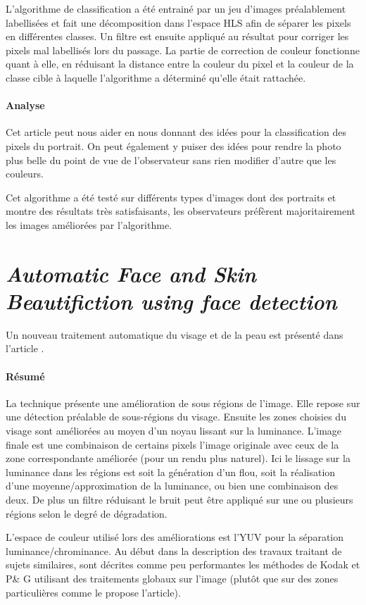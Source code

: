 \documentclass[11pt, french]{report-rd-info}
\begin{document}
L'algorithme de classification a été entrainé par un jeu d'images préalablement labellisées et fait une décomposition dans l'espace HLS afin de séparer les pixels en différentes classes. Un filtre est ensuite appliqué au résultat pour corriger les pixels mal labellisés lors du passage.
La partie de correction de couleur fonctionne quant à elle, en réduisant la distance entre la couleur du pixel et la couleur de la classe cible à laquelle l'algorithme a déterminé qu'elle était rattachée.

\paragraph{Analyse}
Cet article peut nous aider en nous donnant des idées pour la classification des pixels du portrait.
On peut également y puiser des idées pour rendre la photo plus belle du point de vue de l'observateur sans rien modifier d'autre que les couleurs.

Cet algorithme a été testé sur différents types d'images dont des portraits et montre des résultats très satisfaisants, les observateurs préfèrent majoritairement les images améliorées par l'algorithme.


\section{\emph{Automatic Face and Skin Beautifiction using face detection}}
Un nouveau traitement automatique du visage et de la peau est présenté dans l’article \cite{Ciuc2010}.

\paragraph{Résumé}
La technique présente une amélioration de sous régions de l’image.  Elle repose sur une détection préalable de sous-régions du visage. Ensuite les zones choisies du visage sont améliorées au moyen d'un noyau lissant sur la luminance. L'image finale est une combinaison de certains pixels l'image originale avec ceux de la zone correspondante améliorée (pour un rendu plus naturel).
Ici le lissage sur la luminance dans les régions est soit la génération d’un flou, soit la réalisation d’une moyenne/approximation de la luminance, ou bien une combinaison des deux. De plus un filtre réduisant le bruit peut être appliqué sur une ou plusieurs régions selon le degré de dégradation.

L’espace de couleur utilisé lors des améliorations est l’YUV pour la séparation luminance/chrominance.
Au début dans la description des travaux traitant de sujets similaires, sont décrites comme peu performantes les méthodes de Kodak et P\& G utilisant des traitements globaux sur l'image (plutôt que sur des zones particulières comme le propose l’article).
\end{document}
